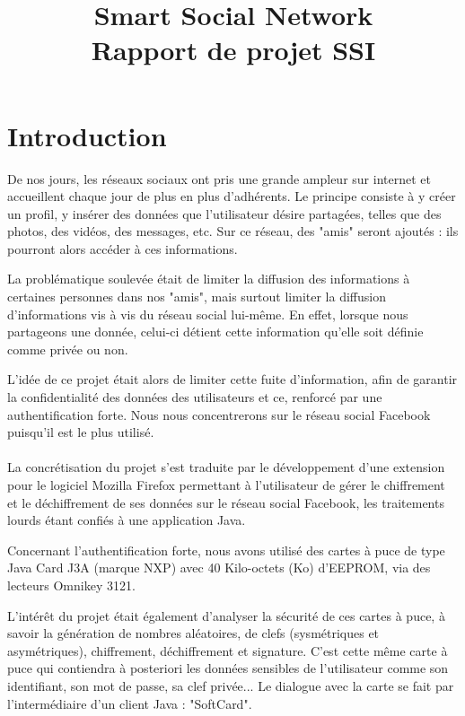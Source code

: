 \documentclass[a4paper,11pt,french]{article}
\title{Smart Social Network\\Rapport de projet SSI }
\begin{document}
\maketitle

\tableofcontents

\section{Introduction}
\renewcommand\labelitemi{\textbullet} %
\renewcommand\labelitemii{$\circ$} %
De nos jours, les réseaux sociaux ont pris une grande ampleur sur internet
et accueillent chaque jour de plus en plus d'adhérents. Le principe consiste à 
y créer un profil, y insérer des données que l'utilisateur désire partagées, 
telles que des photos, des vidéos, des messages, etc. Sur ce réseau, des "amis"
seront ajoutés : ils pourront alors accéder à ces informations.

La problématique soulevée était de limiter la diffusion des informations à 
certaines personnes dans nos "amis", mais surtout limiter la diffusion 
d'informations vis à vis du réseau social lui-même. En effet, lorsque nous 
partageons une donnée, celui-ci détient cette information qu'elle soit définie
comme privée ou non.

L'idée de ce projet était alors de limiter cette fuite d'information, afin de 
garantir la confidentialité des données des utilisateurs et ce, renforcé par une
authentification forte. Nous nous concentrerons sur le réseau social Facebook 
puisqu'il est le plus utilisé.


\paragraph{}
La concrétisation du projet s'est traduite par le développement d'une extension 
pour le logiciel Mozilla Firefox permettant à l’utilisateur de gérer le 
chiffrement et le déchiffrement de ses données sur le réseau social Facebook, 
les traitements lourds étant confiés à une application Java.

Concernant l’authentification forte, nous avons utilisé des cartes à puce de 
type Java Card J3A (marque NXP) avec 40 Kilo-octets (Ko) d'EEPROM, via des 
lecteurs Omnikey 3121. 

L'intérêt du projet était également d'analyser la sécurité de ces cartes à puce,
à savoir la génération de nombres aléatoires, de clefs (sysmétriques et 
asymétriques), chiffrement, déchiffrement et signature. C'est cette même carte
à puce qui contiendra à posteriori les données sensibles de l’utilisateur 
comme son identifiant, son mot de passe, sa clef privée... Le dialogue avec 
la carte se fait par l’intermédiaire d’un client Java : "SoftCard". 
\end{document}
